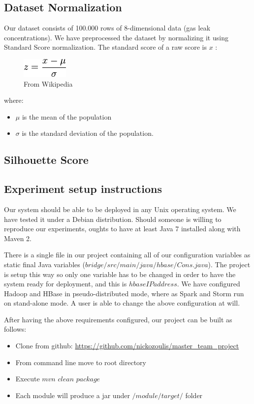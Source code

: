 \documentclass{lmproj}
\begin{document}
\subsection{Dataset Normalization}
Our dataset consists of 100.000 rows of 8-dimensional data (gas leak concentrations). We have preprocessed the dataset by normalizing it using Standard Score normalization. The standard score of a raw score is $x$ :

\begin{figure}[h]
	\centering
	\includegraphics{standard_score}
	\caption{From Wikipedia}
\end{figure}

where:
\begin{itemize}
	\item $\mu$ is the mean of the population
	\item $\sigma$ is the standard deviation of the population.
\end{itemize}

\subsection{Silhouette Score}

\subsection{Experiment setup instructions}

Our system should be able to be deployed in any Unix operating system. We have tested it under a Debian distribution. Should someone is willing to reproduce our experiments, oughts to have at least Java 7 installed along with Maven 2. 

There is a single file in our project containing all of our configuration variables as static final Java variables ($bridge/src/main/java/hbase/Cons.java$). The project is setup this way so only one variable has to be changed in order to have the system ready for deployment, and this is $hbaseIPaddress$. We have configured Hadoop and HBase in pseudo-distributed mode, where as Spark and Storm run on stand-alone mode. A user is able to change the above configuration at will. 

After having the above requirements configured, our project can be built as follows:

\begin{itemize}
	\item Clone from github:   \url{https://github.com/nickozoulis/master_team_project} 
	\item From command line move to root directory
	\item Execute $mvn$ $clean$ $package$ 
	\item Each module will produce a jar under $/module/target/$ folder
\end{itemize}
\end{document}
